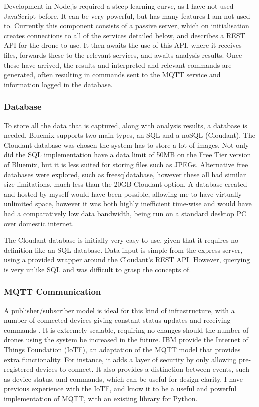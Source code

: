 \documentclass{article}
\begin{document}
\vspace{\baselineskip} \noindent
Development in Node.js required a steep learning curve, as I have not used JavaScript before. It can be very powerful, but has many features I am not used to. Currently this component consists of a passive server, which on initialisation creates connections to all of the services detailed below, and describes a REST API for the drone to use. It then awaits the use of this API, where it receives files, forwards these to the relevant services, and awaits analysis results. Once these have arrived, the results and interpreted and relevant commands are generated, often resulting in commands sent to the MQTT service and information logged in the database.

\subsubsection{Database}
To store all the data that is captured, along with analysis results, a database is needed. Bluemix supports two main types, an SQL and a noSQL (Cloudant). The Cloudant database was chosen the system has to store a lot of images. Not only did the SQL implementation have a data limit of 50MB on the Free Tier version of Bluemix, but it is less suited for storing files such as JPEGs. Alternative free databases were explored, such as freesqldatabase\cite{FreeSQL}, however these all had similar size limitations, much less than the 20GB Cloudant option. A database created and hosted by myself would have been possible, allowing me to have virtually unlimited space, however it was both highly inefficient time-wise and would have had a comparatively low data bandwidth, being run on a standard desktop PC over domestic internet.

\vspace{\baselineskip} \noindent
The Cloudant database is initially very easy to use, given that it requires no definition like an SQL database. Data input is simple from the express server, using a provided wrapper around the Cloudant's REST API. However, querying is very unlike SQL and was difficult to grasp the concepts of.

\subsubsection{MQTT Communication}
A publisher/subscriber model is ideal for this kind of infrastructure, with a number of connected devices giving constant status updates and receiving commands \cite{Microservices}. It is extremely scalable, requiring no changes should the number of drones using the system be increased in the future. IBM provide the Internet of Things Foundation (IoTF), an adaptation of the MQTT model that provides extra functionality. For instance, it adds a layer of security by only allowing pre-registered devices to connect. It also provides a distinction between events, such as device status, and commands, which can be useful for design clarity. I have previous experience with the IoTF, and know it to be a useful and powerful implementation of MQTT, with an existing library for Python.
\end{document}

